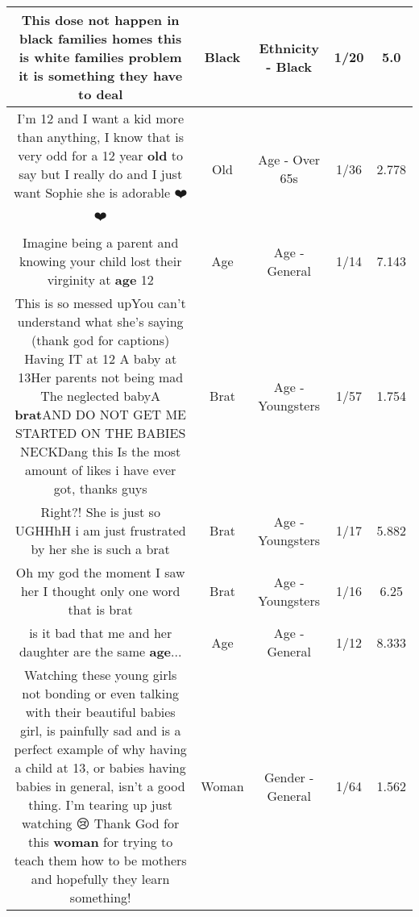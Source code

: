 \documentclass[11pt]{article}
\newlength\mylength
\begin{document}
\begin{center}
\begin{longtable}{|C{.65\mylength}|C{.30\mylength}|C{.12\mylength}|C{.12\mylength}|C{.12\mylength}|}
  \small This dose not happen in \textbf{black} families homes this is white families problem it is something they have to deal\normalsize   & Black & Ethnicity - Black & 1/20 & 5.0 \\  \hline
  \small I'm 12 and I want a kid more than anything, I know that is very odd for a 12 year \textbf{old} to say but I really do and I just want Sophie she is adorable ❤️❤️\normalsize   & Old & Age - Over 65s & 1/36 & 2.778 \\  \hline
  \small Imagine being a parent and knowing your child lost their virginity at \textbf{age} 12\normalsize   & Age & Age - General & 1/14 & 7.143 \\  \hline
  \small This is so messed upYou can't understand what she's saying (thank god for captions) Having IT at 12 A baby at 13Her parents not being mad The neglected babyA \textbf{brat}AND DO NOT GET ME STARTED ON THE BABIES NECKDang this Is the most amount of likes i have ever got, thanks guys\normalsize   & Brat & Age - Youngsters & 1/57 & 1.754 \\  \hline
  \small Right?! She is just so UGHHhH i am just frustrated by her she is such a brat\normalsize   & Brat & Age - Youngsters & 1/17 & 5.882 \\  \hline
  \small Oh my god the moment I saw her I thought only one word that is brat\normalsize   & Brat & Age - Youngsters & 1/16 & 6.25 \\  \hline
  \small is it bad that me and her daughter are the same \textbf{age}...\normalsize   & Age & Age - General & 1/12 & 8.333 \\  \hline
  \small Watching these young girls not bonding or even talking with their beautiful babies girl, is painfully sad and is a perfect example of why having a child at 13, or babies having babies in general, isn't a good thing. I'm tearing up just watching 😢 Thank God for this \textbf{woman} for trying to teach them how to be mothers and hopefully they learn something!\normalsize   & Woman & Gender - General & 1/64 & 1.562 \\  \hline

\end{longtable}
\end{center}
\end{document}

